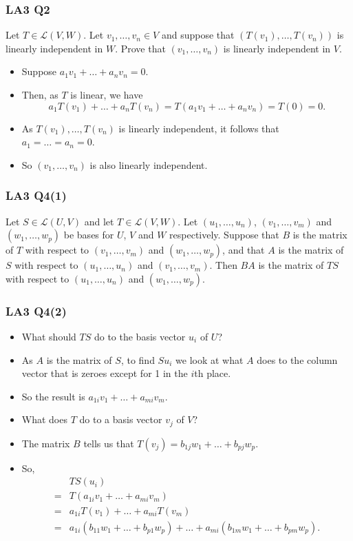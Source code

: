 \documentclass[handout]{beamer}
\newcommand{\cL}{\mathcal{L}}
\begin{document}
\begin{frame}
\frametitle{LA3 Q2}
Let $T\in \cL(V,W)$. Let $v_1,\ldots, v_n\in V$ and suppose that $(T(v_1),\ldots, T(v_n))$ is linearly independent in $W$. Prove that $(v_1,\ldots, v_n)$ is linearly independent in $V$.\vspace{0.5cm}
\begin{itemize}
\item Suppose $a_1v_1+\ldots+a_nv_n = 0$. \vspace{0.2cm}
\item Then, as $T$ is linear, we have
\[a_1T(v_1)+\ldots +a_nT(v_n)=T(a_1v_1+\ldots+a_nv_n) = T(0) = 0.\]
\item As $T(v_1),\ldots, T(v_n)$ is linearly independent, it follows that $a_1=\ldots=a_n=0$. \vspace{0.2cm}
\item So $(v_1,\ldots, v_n)$ is also linearly independent. 
\end{itemize}
\end{frame}

\begin{frame}
\frametitle{LA3 Q4(1)}
Let $S\in \cL(U,V)$ and let $T\in\cL(V,W)$. Let $(u_1,\ldots,u_n)$, $(v_1,\ldots,v_m)$ and $(w_1,\ldots, w_p)$ be bases for $U$, $V$ and $W$ respectively. Suppose that $B$ is the matrix of $T$ with respect to $(v_1,\ldots,v_m)$ and $(w_1,\ldots, w_p)$, and that $A$ is the matrix of $S$ with respect to $(u_1,\ldots,u_n)$ and $(v_1,\ldots,v_m)$. Then $BA$ is the matrix of $TS$ with respect to $(u_1,\ldots,u_n)$ and $(w_1,\ldots, w_p)$.

\end{frame}

\begin{frame}
\frametitle{LA3 Q4(2)}
\begin{itemize}
\item What should $TS$ do to the basis vector $u_i$ of $U$? \vspace{0.2cm}
\item As $A$ is the matrix of $S$, to find $Su_i$ we look at what $A$ does to the column vector that is zeroes except for 1 in the $i$th place. \vspace{0.2cm}
\item So the result is $a_{1i}v_1 + \ldots + a_{mi}v_m$. \vspace{0.2cm}
\item What does $T$ do to a basis vector $v_j$ of $V$? \vspace{0.2cm}
\item The matrix $B$ tells us that $T(v_j) = b_{1j}w_1+\ldots+ b_{pj}w_p$. \vspace{0.2cm}
\item So, 
\begin{align*}&TS(u_i)\\ 
=& T(a_{1i}v_1 + \ldots + a_{mi}v_m)\\
=& a_{1i}T(v_1)+\ldots + a_{mi}T(v_m)\\
=& a_{1i}(b_{11}w_1+\ldots+ b_{p1}w_p) + \ldots + a_{mi}(b_{1m}w_1+\ldots+ b_{pm}w_p). \end{align*}
\end{itemize}
\end{frame}
\end{document}
